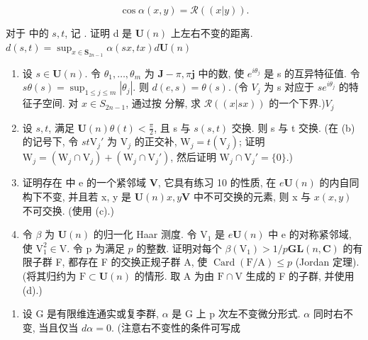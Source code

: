 \[
\cos \alpha (x, y) = \mathscr {R} ((x | y)).
\]

对于  中的 \(s, t\), 记 . 证明 d 是 \(\mathbf{U}(n)\) 上左右不变的距离.\(d(s, t) = \sup_{x \in \mathbf{S}_{2n-1}} \alpha(sx, tx)\)\(d\)\(\mathbf{U}(n)\)

\begin{enumerate}
\def\labelenumi{(\alph{enumi})}
\setcounter{enumi}{1}
\item
  设 \(s \in \mathbf{U}(n)\). 令 \(\theta_1, \ldots, \theta_m\) 为 \(\mathbf{J} - \pi, \pi \mathbf{j}\) 中的数, 使 \(e^{i\theta_j}\) 是 s 的互异特征值. 令 \(s\)\(\theta(s) = \sup_{1 \leqslant j \leqslant m} |\theta_j|\). 则 \(d(e, s) = \theta(s)\). (令 \(V_j\) 为 s 对应于 \(s\)\(e^{i\theta_j}\) 的特征子空间. 对 \(x \in S_{2n-1}\), 通过按  分解, 求 \(\mathcal{R}((x|sx))\) 的一个下界.)\(V_j\)
\item
  设 \(s, t\), 满足 \(\mathbf{U}(n)\)\(\theta(t) < \frac{\pi}{2}\), 且 s 与 \(s\)\((s, t)\) 交换. 则 s 与 t 交换. (在 (b) 的记号下, 令 \(s\)\(t\)\(\mathrm{V}_j'\) 为 \(\mathrm{V}_j\) 的正交补, \(\mathrm{W}_j = t(\mathrm{V}_j)\); 证明 \(\mathrm{W}_j = (\mathrm{W}_j \cap \mathrm{V}_j) + (\mathrm{W}_j \cap \mathrm{V}_j')\), 然后证明 \(\mathrm{W}_j \cap \mathrm{V}_j' = \{0\}\).)
\item
  证明存在  中 e 的一个紧邻域 \(\mathbf{V}\), 它具有练习 10 的性质, 在 \(e\)\(\mathbf{U}(n)\) 的内自同构下不变, 并且若 x, y 是 \(\mathbf{U}(n)\)\(x, y\)\(\mathbf{V}\) 中不可交换的元素, 则 x 与 \(x\)\((x, y)\) 不可交换. (使用 (c).)
\item
  令 \(\beta\) 为 \(\mathbf{U}(n)\) 的归一化 Haar 测度. 令 \(\mathrm{V}_1\) 是 \(e\)\(\mathbf{U}(n)\) 中 e 的对称紧邻域, 使 \(\mathrm{V}_1^2 \in \mathrm{V}\). 令 p 为满足 \(p\) 的整数. 证明对每个 \(\beta (\mathrm{V}_1) > 1 / p\)\(\mathbf{GL}(n,\mathbf{C})\) 的有限子群 F, 都存在 F 的交换正规子群 A, 使 \(\operatorname{Card}(\mathrm{F} / \mathrm{A}) \leqslant p\) (Jordan 定理). (将其归约为 \(\mathrm{F} \subset \mathbf{U}(n)\) 的情形. 取 A 为由 \(\mathrm{F} \cap \mathrm{V}\) 生成的 F 的子群, 并使用 (d).)
\end{enumerate}

\begin{enumerate}
\def\labelenumi{\arabic{enumi}.}
\setcounter{enumi}{11}
\tightlist
\item
  设 G 是有限维连通实或复李群, \(\alpha\) 是 G 上 p 次左不变微分形式. \(\alpha\) 同时右不变, 当且仅当 \(d\alpha = 0\). (注意右不变性的条件可写成
\end{enumerate}


